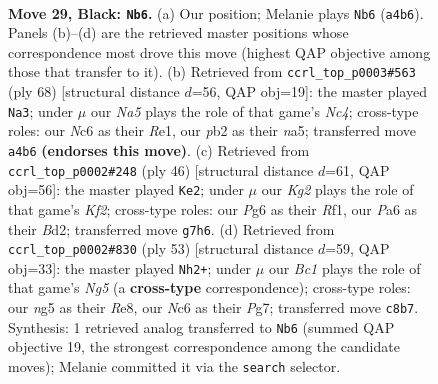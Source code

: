 \documentclass[11pt]{article}
\begin{document}
\clearpage

\begin{figure}[p]\centering
\begin{subfigure}{0.46\textwidth}\centering
\resizebox{\linewidth}{!}{%
\newchessgame
\chessboard[
  setfen={2b4r/r5k1/p1n1P1p1/p4pNp/n1B2B2/P4PP1/1P5P/RK1R4 b - - 0 29},
  showmover=false,
  pgfstyle=straightmove, color=movearrow, markmove={a4-b6}
]}
\caption{}
\end{subfigure}\hfill
\begin{subfigure}{0.46\textwidth}\centering
\resizebox{\linewidth}{!}{%
\newchessgame
\chessboard[
  setfen={4r3/p1b5/P3k1p1/n1prppPp/2N4P/2P1BP2/1PK1R3/4R3 w - - 3 35},
  showmover=false,
  pgfstyle=straightmove, color=movearrow, markmove={c4-a3}
]}
\caption{}
\end{subfigure}
\\[4pt]
\begin{subfigure}{0.46\textwidth}\centering
\resizebox{\linewidth}{!}{%
\newchessgame
\chessboard[
  setfen={2kr1b2/1bp4r/pp6/3nPp2/P1N2Ppp/2PP4/2NB1KPP/R4R2 w - - 0 24},
  showmover=false,
  pgfstyle=straightmove, color=movearrow, markmove={f2-e2}
]}
\caption{}
\end{subfigure}\hfill
\begin{subfigure}{0.46\textwidth}\centering
\resizebox{\linewidth}{!}{%
\newchessgame
\chessboard[
  setfen={2r1r1k1/5pp1/p3p1p1/Pp1n2B1/1b4nP/1N4P1/1P2PPB1/R2R1K2 b - - 11 27},
  showmover=false,
  pgfstyle=straightmove, color=movearrow, markmove={g4-h2}
]}
\caption{}
\end{subfigure}
\caption{\textbf{Move 29, Black: \texttt{Nb6}.} (a) Our position; Melanie plays \texttt{Nb6} (\texttt{a4b6}). Panels (b)--(d) are the retrieved master positions whose correspondence most drove this move (highest QAP objective among those that transfer to it). (b) Retrieved from \texttt{ccrl\_top\_p0003\#563} (ply 68) [structural distance $d$=56, QAP obj=19]: the master played \texttt{Na3}; under $\mu$ our \emph{Na5} plays the role of that game's \emph{Nc4}; cross-type roles: our \emph{N}c6 as their \emph{R}e1, our \emph{p}b2 as their \emph{n}a5; transferred move \texttt{a4b6} \textbf{(endorses this move)}. (c) Retrieved from \texttt{ccrl\_top\_p0002\#248} (ply 46) [structural distance $d$=61, QAP obj=56]: the master played \texttt{Ke2}; under $\mu$ our \emph{Kg2} plays the role of that game's \emph{Kf2}; cross-type roles: our \emph{P}g6 as their \emph{R}f1, our \emph{P}a6 as their \emph{B}d2; transferred move \texttt{g7h6}. (d) Retrieved from \texttt{ccrl\_top\_p0002\#830} (ply 53) [structural distance $d$=59, QAP obj=33]: the master played \texttt{Nh2+}; under $\mu$ our \emph{Bc1} plays the role of that game's \emph{Ng5} (a \textbf{cross-type} correspondence); cross-type roles: our \emph{n}g5 as their \emph{R}e8, our \emph{N}c6 as their \emph{P}g7; transferred move \texttt{c8b7}. Synthesis: 1 retrieved analog transferred to \texttt{Nb6} (summed QAP objective 19, the strongest correspondence among the candidate moves); Melanie committed it via the \texttt{search} selector.}
\label{fig:thought-m57}
\end{figure}
\end{document}
